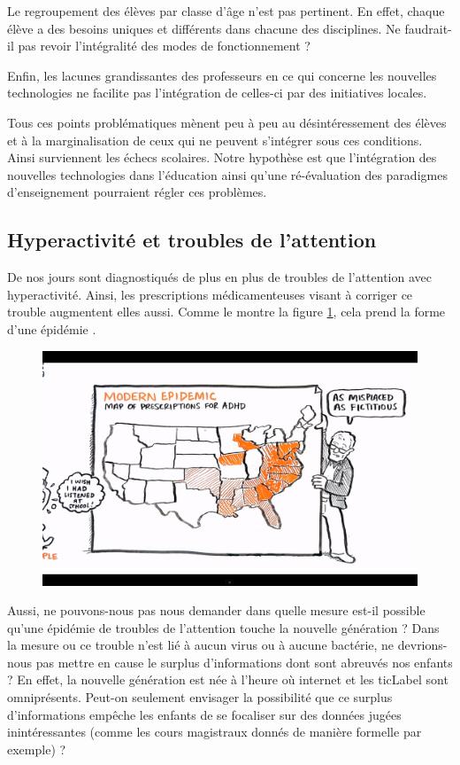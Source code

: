 Le regroupement des élèves par classe d'âge n'est pas pertinent. En effet, chaque élève a des besoins uniques et différents dans chacune des disciplines. Ne faudrait-il pas revoir l'intégralité des modes de fonctionnement ?

Enfin, les lacunes grandissantes des professeurs en ce qui concerne les nouvelles technologies ne facilite pas l'intégration de celles-ci par des initiatives locales.

Tous ces points problématiques mènent peu à peu au désintéressement des élèves et à la marginalisation de ceux qui ne peuvent s'intégrer sous ces conditions. Ainsi surviennent les échecs scolaires. Notre hypothèse est que l'intégration des nouvelles technologies dans l'éducation ainsi qu'une ré-évaluation des paradigmes d'enseignement pourraient régler ces problèmes.

\subsection{Hyperactivité et troubles de l'attention}
De nos jours sont diagnostiqués de plus en plus de troubles de l'attention avec hyperactivité. Ainsi, les prescriptions médicamenteuses visant à corriger ce trouble augmentent elles aussi. Comme le montre la figure \ref{adhd_map}, cela prend la forme d'une épidémie \cite{robinson2010paradigms}.
\begin{figure}[h]
\includegraphics[trim=1.9cm 1.5cm 0cm 1.5cm, clip=true, width=\linewidth]{../resources/illustrations/ADHD}
\label{adhd_map}
\end{figure}
Aussi, ne pouvons-nous pas nous demander dans quelle mesure est-il possible qu'une épidémie de troubles de l'attention touche la nouvelle génération ? Dans la mesure ou ce trouble n'est lié à aucun virus ou à aucune bactérie, ne devrions-nous pas mettre en cause le surplus d'informations dont sont abreuvés nos enfants ? En effet, la nouvelle génération est née à l'heure où internet et les \gls{ticLabel} sont omniprésents. Peut-on seulement envisager la possibilité que ce surplus d'informations empêche les enfants de se focaliser sur des données jugées inintéressantes (comme les cours magistraux donnés de manière formelle par exemple) ?

